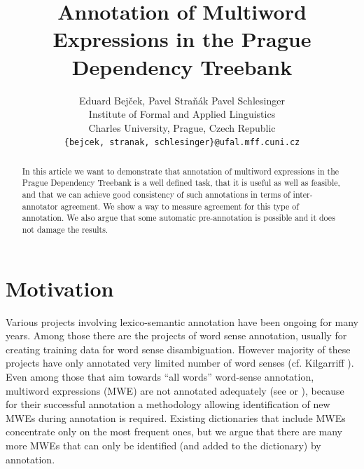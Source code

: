 \documentclass[11pt]{article}
\title{Annotation of Multiword Expressions in the Prague Dependency Treebank}
\author{Eduard Bejček, Pavel Straňák \protect{and} Pavel Schlesinger\\
  Institute of Formal and Applied Linguistics\\
  Charles University, Prague, Czech Republic\\
  {\tt \{bejcek,\,stranak,\,schlesinger\}@ufal.mff.cuni.cz}}
\date{}
\begin{document}
\maketitle

\begin{abstract}
In this article we want to demonstrate that annotation of multiword expressions in the Prague Dependency Treebank is a well defined task,  
that it is useful as well as feasible, and that we can achieve good consistency of such annotations in terms of inter-annotator agreement. We show a way to measure
agreement for this type of annotation. We also argue that some automatic pre-annotation is possible and it does not damage the results. 



\end{abstract}


\section{Motivation} 
\label{sec:motiv}

Various projects involving lexico-semantic annotation have been ongoing for many years. 
Among those there are the projects of word sense annotation, usually for creating training data for word sense disambiguation. However majority of these projects have only annotated very limited number of word senses (cf. Kilgarriff ). Even among those that aim towards ``all words'' word-sense annotation, multiword expressions (MWE) are not annotated ade\-qua\-te\-ly (see \cite{mihalcea:1998} or \cite{hajic-cwn:04}), 
because for their successful annotation a methodology allowing identification of new MWEs during annotation is required. Existing dictionaries that include MWEs concentrate only on the most frequent ones, but we argue that there are many more MWEs that can only be identified (and added to the dictionary) by annotation.
\end{document}
